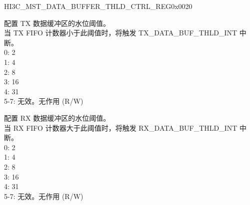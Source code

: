 \begin{register}{H}{I3C\_MST\_DATA\_BUFFER\_THLD\_CTRL\_REG}{0x0020}\label{regdesc:I3CMSTDATABUFFERTHLDCTRLREG}
%
%
%
\regnewline%
\begin{regdesc}\begin{reglist}
\label{fielddesc:I3CMSTREGTXDATABUFTHLD}\item [I3C\_MST\_REG\_TX\_DATA\_BUF\_THLD] 配置 TX 数据缓冲区的水位阈值。\\
当 TX FIFO 计数器小于此阈值时，将触发 TX\_DATA\_BUF\_THLD\_INT 中断。\\
0: 2\\
1: 4\\
2: 8\\
3: 16\\
4: 31\\
5-7: 无效。无作用 (R/W)
\label{fielddesc:I3CMSTREGRXDATABUFTHLD}\item [I3C\_MST\_REG\_RX\_DATA\_BUF\_THLD] 配置 RX 数据缓冲区的水位阈值。\\
当 RX FIFO 计数器大于此阈值时，将触发 RX\_DATA\_BUF\_THLD\_INT 中断。\\
0: 2\\
1: 4\\
2: 8\\
3: 16\\
4: 31\\
5-7: 无效。无作用 (R/W)
\end{reglist}\end{regdesc}
\end{register}


